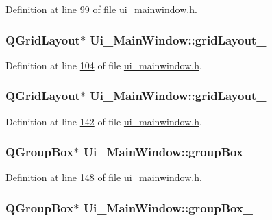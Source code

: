 Definition at line \hyperlink{a00139_source_l00099}{99} of file \hyperlink{a00139_source}{ui\+\_\+mainwindow.\+h}.

\hypertarget{a00080_a20728ed83bf740332bd908ea3e15ace6}{
\subsubsection[{grid\+Layout\+\_\+8}]{\setlength{\rightskip}{0pt plus 5cm}Q\+Grid\+Layout$\ast$ Ui\+\_\+\+Main\+Window\+::grid\+Layout\+\_}}\label{a00080_a20728ed83bf740332bd908ea3e15ace6}


Definition at line \hyperlink{a00139_source_l00104}{104} of file \hyperlink{a00139_source}{ui\+\_\+mainwindow.\+h}.

\hypertarget{a00080_aa03590dd5aac614bf717649a544c015f}{
\subsubsection[{grid\+Layout\+\_\+9}]{\setlength{\rightskip}{0pt plus 5cm}Q\+Grid\+Layout$\ast$ Ui\+\_\+\+Main\+Window\+::grid\+Layout\+\_}}\label{a00080_aa03590dd5aac614bf717649a544c015f}


Definition at line \hyperlink{a00139_source_l00142}{142} of file \hyperlink{a00139_source}{ui\+\_\+mainwindow.\+h}.

\hypertarget{a00080_a417cb0342ea95d3fe5f7e3f4feeb6515}{
\subsubsection[{group\+Box\+\_\+11}]{\setlength{\rightskip}{0pt plus 5cm}Q\+Group\+Box$\ast$ Ui\+\_\+\+Main\+Window\+::group\+Box\+\_}}\label{a00080_a417cb0342ea95d3fe5f7e3f4feeb6515}


Definition at line \hyperlink{a00139_source_l00148}{148} of file \hyperlink{a00139_source}{ui\+\_\+mainwindow.\+h}.

\hypertarget{a00080_af55cd87dbe0f7d42980b1012f15cae2d}{
\subsubsection[{group\+Box\+\_\+12}]{\setlength{\rightskip}{0pt plus 5cm}Q\+Group\+Box$\ast$ Ui\+\_\+\+Main\+Window\+::group\+Box\+\_}}\label{a00080_af55cd87dbe0f7d42980b1012f15cae2d}


